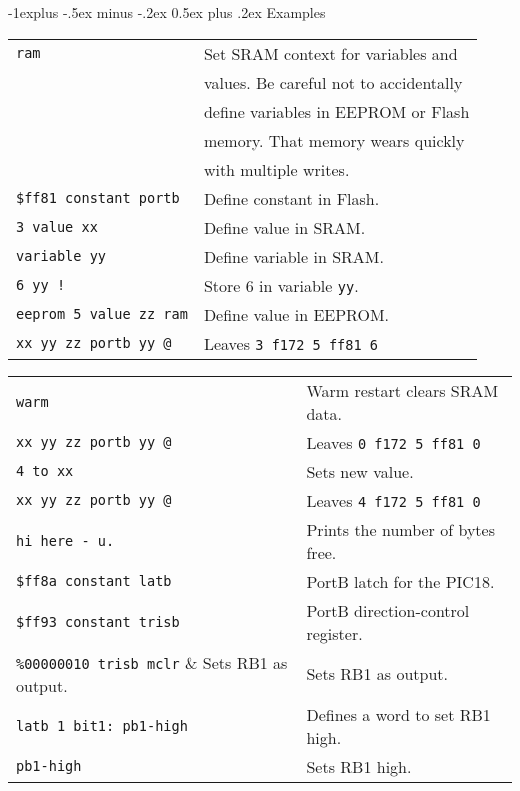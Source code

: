 \documentclass[10pt,landscape,a4paper]{article}
\makeatletter
\renewcommand{\subsection}{\@startsection{subsection}{2}{0mm}%
                                {-1explus -.5ex minus -.2ex}%
                                {0.5ex plus .2ex}%
                                {\normalfont\normalsize\bfseries}}
\makeatother
\begin{document}
\begin{multicols}{3}
\subsection{Examples}
\begin{tabular}{@{}ll@{}}
\verb!ram!  & Set SRAM context for variables and \\
            & values.  Be careful not to accidentally \\
            & define variables in EEPROM or Flash \\
            & memory.  That memory wears quickly \\
            & with multiple writes. \\
\verb!$ff81 constant portb!  & Define constant in Flash. \\
\verb!3 value xx!  & Define value in SRAM. \\
\verb!variable yy!  & Define variable in SRAM. \\
\verb?6 yy !?  & Store 6 in variable \verb!yy!. \\
\verb!eeprom 5 value zz ram!  &  Define value in EEPROM. \\
\verb!xx yy zz portb yy @!  & Leaves \verb!3 f172 5 ff81 6! \\
\end{tabular}
\begin{tabular}{@{}ll@{}}
\verb!warm!  & Warm restart clears SRAM data. \\
\verb!xx yy zz portb yy @!  & Leaves \verb!0 f172 5 ff81 0! \\
\verb!4 to xx!  & Sets new value. \\ 
\verb!xx yy zz portb yy @!  & Leaves \verb!4 f172 5 ff81 0! \\
\verb!hi here - u.! & Prints the number of bytes free. \\
\verb!$ff8a constant latb! & PortB latch for the PIC18. \\
\verb!$ff93 constant trisb! & PortB direction-control register. \\
\verb!%00000010 trisb mclr! & Sets RB1 as output. \\ 
\verb!latb 1 bit1: pb1-high! & Defines a word to set RB1 high. \\
\verb!pb1-high! & Sets RB1 high. \\
\end{tabular}

\bigskip


\end{multicols}
\end{document}
